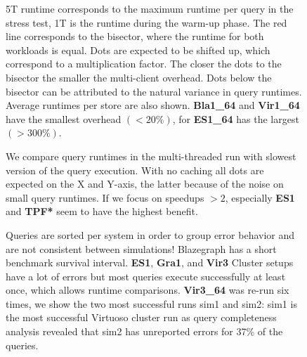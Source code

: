 \documentclass[twocolumn]{bmcart}%
\def\texttt{[image: ]}
\begin{document}
\begin{backmatter}
\begin{figure}[ht!]
	\centering
	\caption{ 
		5T runtime corresponds to the maximum runtime per query in the stress test, 1T is the runtime during the warm-up phase. The red line corresponds to the bisector, where the runtime for both workloads is equal. Dots are expected to be shifted up, which correspond to a multiplication factor. The closer the dots to the bisector the smaller the multi-client overhead. Dots below the bisector can be attributed to the natural variance in query runtimes. Average runtimes per store are also shown. \textbf{Bla1\_64} and \textbf{Vir1\_64} have the smallest overhead $(< 20\%)$, for \textbf{ES1\_64} has the largest $(> 300\%)$.
	}
	\label{fig:Fig07_Watdiv_SingleMultiClient}
\end{figure}

\begin{figure}[ht!]
	\centering
	\caption{ We compare query runtimes in the multi-threaded run with slowest version of the query execution. With no caching all dots are expected on the X and Y-axis, the latter because of the noise on small query runtimes. If we focus on speedups $> 2$, especially \textbf{ES1} and \textbf{TPF*} seem to have the highest benefit.  }
	\label{fig:Fig08_Watdiv_caching}
\end{figure}

\begin{figure}[ht!]
	\centering
	\caption{
		Queries are sorted per system in order to group error behavior and are not consistent between simulations!
		Blazegraph has a short benchmark survival interval. \textbf{ES1}, \textbf{Gra1}, and \textbf{Vir3} Cluster setups have a lot of errors but most queries execute successfully at least once, which allows runtime comparisons. \textbf{Vir3\_64} was re-run six times, we show the two most successful runs sim1 and sim2: sim1 is the most successful Virtuoso cluster run as query completeness analysis revealed that sim2 has unreported errors for 37\% of the queries.
	}
	\label{fig:Fig09_FailuresOntoforceBM}
\end{figure}   


\end{backmatter}
\end{document}
